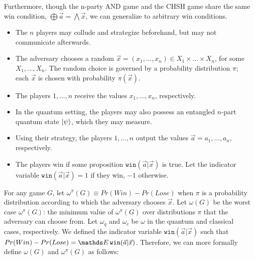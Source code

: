 




Furthermore, though the n-party AND game and the CHSH game share the same win condition, $\bigoplus \vec{a} = \bigwedge \vec{x}$, we can generalize to arbitrary win conditions.

\begin{itemize}
\item{The $n$ players may collude and strategize beforehand, but may not communicate afterwards.}
\item{The adversary chooses a random $\vec{x}=(x_1, ..., x_n) \in X_1 \times ... \times X_n$, for some $X_1, ..., X_n$. The random choice is governed by a probability distribution $\pi$; each $\vec{x}$ is chosen with probability $\pi(\vec{x})$.}
\item{The players $1, ..., n$ receive the values $x_1, ..., x_n$, respectively.}
\item{In the quantum setting, the players may also possess an entangled $n$-part quantum state $\ket{\psi}$, which they may measure.}
\item{Using their strategy, the players $1, ..., n$ output the values $\vec{a} = a_1, ..., a_n$, respectively.}
\item{The players win if some proposition $\texttt{win}(\vec{a} | \vec{x})$ is true. Let the indicator variable $\texttt{win}(\vec{a}|\vec{x}) = 1$ if they win, $-1$ otherwise.}
\end{itemize}

For any game $G$, let $\omega^\pi(G) \equiv Pr(Win) - Pr(Lose)$ when $\pi$ is a probability distribution according to which the adversary chooses $\vec{x}$. Let $\omega(G)$ be the worst case $\omega^\pi(G)$: the minimum value of $\omega^\pi(G)$ over distributions $\pi$ that the adversary can choose from. Let $\omega_q$ and $\omega_c$ be $\omega$ in the quantum and classical cases, respectively. We defined the indicator variable $\texttt{win}(\vec{a}|\vec{x})$ such that $Pr(Win) - Pr(Lose) = \Expected \texttt{win}(\vec{a}|\vec{x})$. Therefore, we can more formally define $\omega(G)$ and $\omega^\pi(G)$ as follows:

